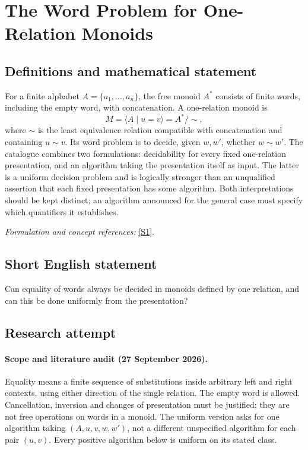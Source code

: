 \documentclass[11pt]{article}
\begin{document}
\section*{\texorpdfstring{The Word Problem for One-Relation Monoids}{The Word Problem for One-Relation Monoids}}\label{359}
\subsection{Definitions and mathematical statement}
For a finite alphabet $A=\{a_1,\ldots,a_n\}$, the free monoid $A^*$ consists of finite words, including the empty word, with concatenation. A one-relation monoid is
\[
 M=\langle A\mid u=v\rangle=A^*/{\sim},
\]
where $\sim$ is the least equivalence relation compatible with concatenation and containing $u\sim v$. Its word problem is to decide, given $w,w'$, whether $w\sim w'$. The catalogue combines two formulations: decidability for every fixed one-relation presentation, and an algorithm taking the presentation itself as input. The latter is a uniform decision problem and is logically stronger than an unqualified assertion that each fixed presentation has some algorithm. Both interpretations should be kept distinct; an algorithm announced for the general case must specify which quantifiers it establishes.
\par\smallskip\textit{Formulation and concept references:} \href{https://arxiv.org/abs/2105.02853}{[S1]}.

\subsection{Short English statement}
Can equality of words always be decided in monoids defined by one relation, and can this be done uniformly from the presentation?
\subsection{Research attempt}
\paragraph{Scope and literature audit (27 September 2026).}
Equality means a finite sequence of substitutions inside arbitrary left
and right contexts, using either direction of the single relation.
The empty word is allowed. Cancellation, inversion and changes of
presentation must be justified; they are not free operations on words
in a monoid. The uniform version asks for one algorithm taking
$(A,u,v,w,w')$, not a different unspecified algorithm for each pair
$(u,v)$. Every positive algorithm below is uniform on its stated class.
\end{document}
